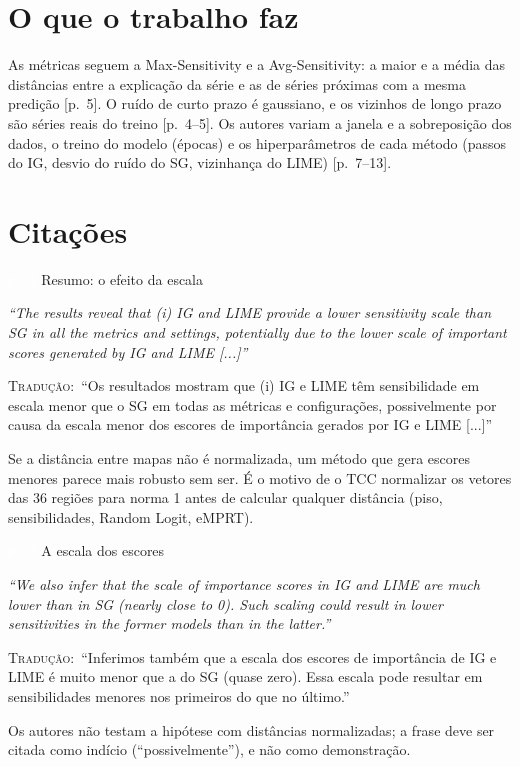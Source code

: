 \documentclass[11pt,a4paper]{article}
\newcommand{\pagechip}[1]{{\setlength{\fboxsep}{1.5pt}\colorbox{cAcc}{\textcolor{white}{\scriptsize\texttt{#1}}}}}
\newenvironment{origquote}{\par\itshape\small}{\par}
\newenvironment{tradquote}{\par\small\textsc{Tradução:}\ }{\par}
\newcommand{\explab}[1]{\par\smallskip{\small\color{cAcc}\textbf{\MakeUppercase{#1}}}\par}
\begin{document}
\section{O que o trabalho faz}
As métricas seguem a Max-Sensitivity e a Avg-Sensitivity: a maior e a média das distâncias entre a explicação da série e as de séries próximas com a mesma predição [p.~5]. O ruído de curto prazo é gaussiano, e os vizinhos de longo prazo são séries reais do treino [p.~4--5]. Os autores variam a janela e a sobreposição dos dados, o treino do modelo (épocas) e os hiperparâmetros de cada método (passos do IG, desvio do ruído do SG, vizinhança do LIME) [p.~7--13].

\section{Citações}

\begin{citacard}{\pagechip{p. 1} Resumo: o efeito da escala}
\begin{origquote}“The results reveal that (i) IG and LIME provide a lower sensitivity scale than SG in all the metrics and settings, potentially due to the lower scale of important scores generated by IG and LIME [...]”\end{origquote}
\begin{tradquote}“Os resultados mostram que (i) IG e LIME têm sensibilidade em escala menor que o SG em todas as métricas e configurações, possivelmente por causa da escala menor dos escores de importância gerados por IG e LIME [...]”\end{tradquote}
\explab{Explicação}
Se a distância entre mapas não é normalizada, um método que gera escores menores parece mais robusto sem ser. É o motivo de o TCC normalizar os vetores das 36 regiões para norma 1 antes de calcular qualquer distância (piso, sensibilidades, Random Logit, eMPRT).
\end{citacard}

\begin{citacard}{\pagechip{p. 7} A escala dos escores}
\begin{origquote}“We also infer that the scale of importance scores in IG and LIME are much lower than in SG (nearly close to 0). Such scaling could result in lower sensitivities in the former models than in the latter.”\end{origquote}
\begin{tradquote}“Inferimos também que a escala dos escores de importância de IG e LIME é muito menor que a do SG (quase zero). Essa escala pode resultar em sensibilidades menores nos primeiros do que no último.”\end{tradquote}
\explab{Explicação}
Os autores não testam a hipótese com distâncias normalizadas; a frase deve ser citada como indício (``possivelmente''), e não como demonstração.
\end{citacard}
\end{document}
